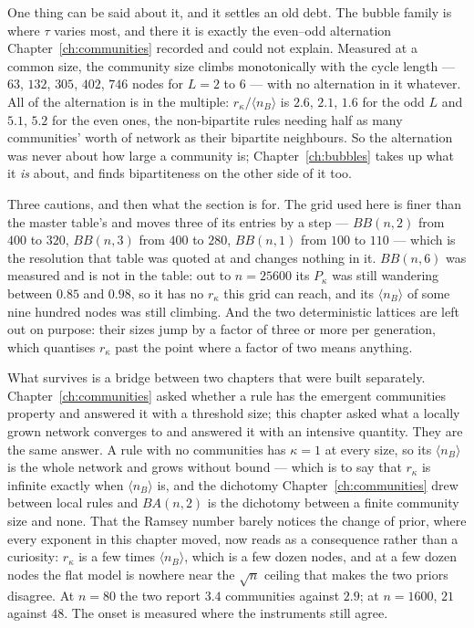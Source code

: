 One thing can be said about it, and it settles an old debt. The bubble family is
where $\tau$ varies most, and there it is exactly the even--odd alternation
Chapter~\ref{ch:communities} recorded and could not explain. Measured at a common
size, the community size climbs monotonically with the cycle length --- $63$,
$132$, $305$, $402$, $746$ nodes for $L=2$ to $6$ --- with no alternation in it
whatever. All of the alternation is in the multiple: $r_\kappa/\langle n_B\rangle$
is $2.6$, $2.1$, $1.6$ for the odd $L$ and $5.1$, $5.2$ for the even ones, the
non-bipartite rules needing half as many communities' worth of network as their
bipartite neighbours. So the alternation was never about how large a community
is; Chapter~\ref{ch:bubbles} takes up what it \emph{is} about, and finds
bipartiteness on the other side of it too.

Three cautions, and then what the section is for. The grid used here is finer
than the master table's and moves three of its entries by a step --- $BB(n,2)$
from $400$ to $320$, $BB(n,3)$ from $400$ to $280$, $BB(n,1)$ from $100$ to
$110$ --- which is the resolution that table was quoted at and changes nothing in
it. $BB(n,6)$ was measured and is not in the table: out to $n=25600$ its
$P_\kappa$ was still wandering between $0.85$ and $0.98$, so it has no $r_\kappa$
this grid can reach, and its $\langle n_B\rangle$ of some nine hundred nodes was
still climbing. And the two deterministic lattices are left out on purpose: their
sizes jump by a factor of three or more per generation, which quantises
$r_\kappa$ past the point where a factor of two means anything.

What survives is a bridge between two chapters that were built separately.
Chapter~\ref{ch:communities} asked whether a rule has the emergent communities
property and answered it with a threshold size; this chapter asked what a locally
grown network converges to and answered it with an intensive quantity. They are
the same answer. A rule with no communities has $\kappa=1$ at every size, so its
$\langle n_B\rangle$ is the whole network and grows without bound --- which is to
say that $r_\kappa$ is infinite exactly when $\langle n_B\rangle$ is, and the
dichotomy Chapter~\ref{ch:communities} drew between local rules and $BA(n,2)$ is
the dichotomy between a finite community size and none. That the Ramsey number
barely notices the change of prior, where every exponent in this chapter moved,
now reads as a consequence rather than a curiosity: $r_\kappa$ is a few times
$\langle n_B\rangle$, which is a few dozen nodes, and at a few dozen nodes the
flat model is nowhere near the $\sqrt n$ ceiling that makes the two priors
disagree. At $n=80$ the two report $3.4$ communities against $2.9$; at $n=1600$,
$21$ against $48$. The onset is measured where the instruments still agree.


